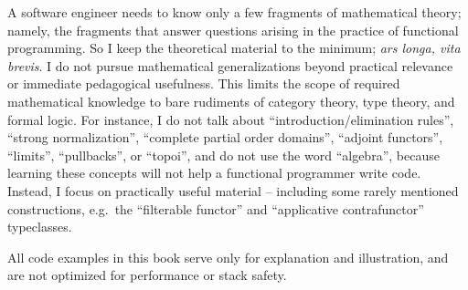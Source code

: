 A software engineer needs to know only a few fragments of mathematical
theory; namely, the fragments that answer questions arising in the
practice of functional programming. So I keep the theoretical material
to the minimum; \emph{ars longa, vita brevis}. I do not pursue mathematical
generalizations beyond practical relevance or immediate pedagogical
usefulness. This limits the scope of required mathematical knowledge
to bare rudiments of category theory, type theory, and formal logic.
For instance, I do not talk about ``introduction/elimination rules'',
``strong normalization'', ``complete partial order domains'',
``adjoint functors'', ``limits'', ``pullbacks'', or ``topoi'',
and do not use the word ``algebra'', because learning these concepts
will not help a functional programmer write code. Instead, I focus
on practically useful material – including some rarely mentioned constructions,
e.g.~the ``filterable functor'' and ``applicative contrafunctor''
typeclasses.

All code examples in this book serve only for explanation and illustration,
and are not optimized for performance or stack safety.

